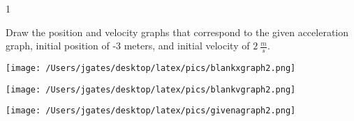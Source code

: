 
\AddToShipoutPicture*{\BackgroundPic}

\addtocounter {ProbNum} {1}

 
{\bf \Large{}} Draw the position and velocity graphs that correspond to the given acceleration graph, initial position of -3 meters, and initial velocity of ${2~\tfrac{m}{s}}$.

\begin{center}
\texttt{[image: /Users/jgates/desktop/latex/pics/blankxgraph2.png]}
\end{center}

\begin{center}
\texttt{[image: /Users/jgates/desktop/latex/pics/blankvgraph2.png]}
\end{center}

\begin{center}
\texttt{[image: /Users/jgates/desktop/latex/pics/givenagraph2.png]}
\end{center}


\vfill
\newpage
